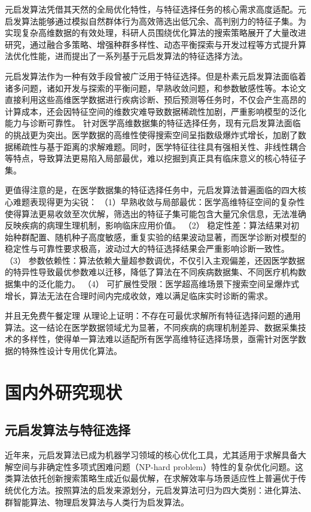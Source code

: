 \documentclass{wzuthesis}
\begin{document}
元启发算法凭借其天然的全局优化特性，与特征选择任务的核心需求高度适配。元启发算法能够通过模拟自然群体行为高效筛选出低冗余、高判别力的特征子集。为实现复杂高维数据的有效处理，科研人员围绕优化算法的搜索策略展开了大量改进研究，通过融合多策略、增强种群多样性、动态平衡探索与开发过程等方式提升算法优化性能，进而提出了一系列基于元启发算法的特征选择方法。

元启发算法作为一种有效手段曾被广泛用于特征选择。但是朴素元启发算法面临着诸多问题，诸如开发与探索的平衡问题，早熟收敛问题，和参数敏感性等。本论文直接利用这些高维医学数据进行疾病诊断、预后预测等任务时，不仅会产生高昂的计算成本，还会因特征空间的维数灾难导致数据稀疏性加剧，严重影响模型的泛化能力与诊断可靠性。
针对医学高维数据集的特征选择任务，现有元启发算法面临的挑战更为突出。医学数据的高维性使得搜索空间呈指数级爆炸式增长，加剧了数据稀疏性与基于距离的求解难题。同时，医学特征往往具有强相关性、非线性耦合等特点，导致算法更易陷入局部最优，难以挖掘到真正具有临床意义的核心特征子集。

更值得注意的是，在医学数据集的特征选择任务中，元启发算法普遍面临的四大核心难题表现得更为尖锐：
（1）早熟收敛与局部最优：医学高维特征空间的复杂性使得算法更易收敛至次优解，筛选出的特征子集可能包含大量冗余信息，无法准确反映疾病的病理生理机制，影响临床应用价值。
（2） 稳定性差：算法结果对初始种群配置、随机种子高度敏感，重复实验的结果波动显著，而医学诊断对模型的稳定性与可靠性要求极高，波动过大的特征选择结果会严重影响诊断一致性。
（3） 参数依赖性：算法依赖大量超参数调优，不仅引入主观偏差，还因医学数据的特异性导致最优参数难以迁移，降低了算法在不同疾病数据集、不同医疗机构数据集中的泛化能力。
（4） 可扩展性受限：医学超高维场景下搜索空间呈爆炸式增长，算法无法在合理时间内完成收敛，难以满足临床实时诊断的需求。

并且无免费午餐定理 从理论上证明：不存在可最优求解所有特征选择问题的通用算法。这一结论在医学数据领域尤为显著，不同疾病的病理机制差异、数据采集技术的多样性，使得单一算法难以适配所有医学高维特征选择场景，亟需针对医学数据的特殊性设计专用优化算法。

\section {国内外研究现状}

\subsection{元启发算法与特征选择}
近年来，元启发算法已成为机器学习领域的核心优化工具，尤其适用于求解具备大解空间与非确定性多项式困难问题（NP-hard problem）特性的复杂优化问题。这类算法依托创新搜索策略生成近似最优解，在求解效率与场景适应性上普遍优于传统优化方法。按照算法的启发来源划分，元启发算法可归为四大类别：进化算法、群智能算法、物理启发算法与人类行为启发算法。
\end{document}
